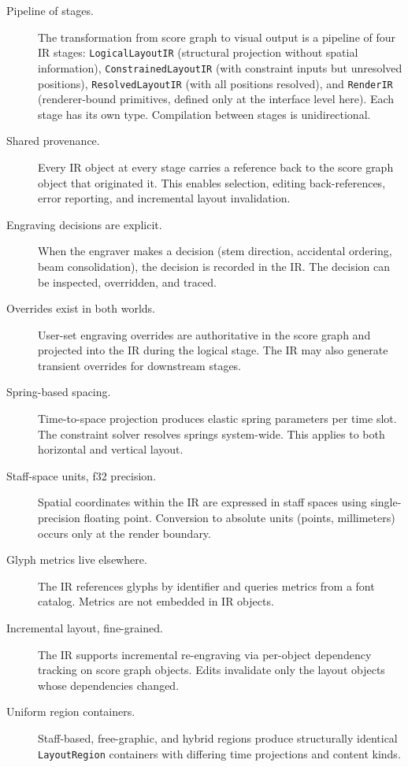 \documentclass[11pt,letterpaper]{report}
\begin{document}
\begin{description}
  \item[Pipeline of stages.] The transformation from score graph to
    visual output is a pipeline of four IR stages:
    \texttt{LogicalLayoutIR} (structural projection without spatial
    information), \texttt{ConstrainedLayoutIR} (with constraint inputs
    but unresolved positions), \texttt{ResolvedLayoutIR} (with all
    positions resolved), and \texttt{RenderIR} (renderer-bound
    primitives, defined only at the interface level here). Each stage
    has its own type. Compilation between stages is unidirectional.
  \item[Shared provenance.] Every IR object at every stage carries a
    reference back to the score graph object that originated it. This
    enables selection, editing back-references, error reporting, and
    incremental layout invalidation.
  \item[Engraving decisions are explicit.] When the engraver makes a
    decision (stem direction, accidental ordering, beam consolidation),
    the decision is recorded in the IR. The decision can be inspected,
    overridden, and traced.
  \item[Overrides exist in both worlds.] User-set engraving overrides
    are authoritative in the score graph and projected into the IR
    during the logical stage. The IR may also generate transient
    overrides for downstream stages.
  \item[Spring-based spacing.] Time-to-space projection produces
    elastic spring parameters per time slot. The constraint solver
    resolves springs system-wide. This applies to both horizontal
    and vertical layout.
  \item[Staff-space units, f32 precision.] Spatial coordinates within
    the IR are expressed in staff spaces using single-precision
    floating point. Conversion to absolute units (points, millimeters)
    occurs only at the render boundary.
  \item[Glyph metrics live elsewhere.] The IR references glyphs by
    identifier and queries metrics from a font catalog. Metrics are
    not embedded in IR objects.
  \item[Incremental layout, fine-grained.] The IR supports incremental
    re-engraving via per-object dependency tracking on score graph
    objects. Edits invalidate only the layout objects whose
    dependencies changed.
  \item[Uniform region containers.] Staff-based, free-graphic, and
    hybrid regions produce structurally identical \texttt{LayoutRegion}
    containers with differing time projections and content kinds.
\end{description}
\end{document}
